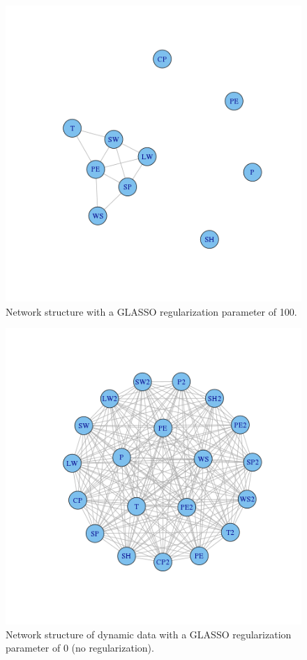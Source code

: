 \documentclass{article}
\begin{document}
\begin{figure}
\includegraphics[width=0.9\columnwidth]{images/data_100.png}
\caption{Network structure with a GLASSO regularization parameter of 100.}
\label{fig:data_100}
\end{figure}

\begin{figure}
\includegraphics[width=0.9\columnwidth]{images/dynamic_0.png}
\caption{Network structure of dynamic data with a GLASSO regularization parameter of 0 (no regularization).}
\label{fig:dynamic_0}
\end{figure}
\end{document}
